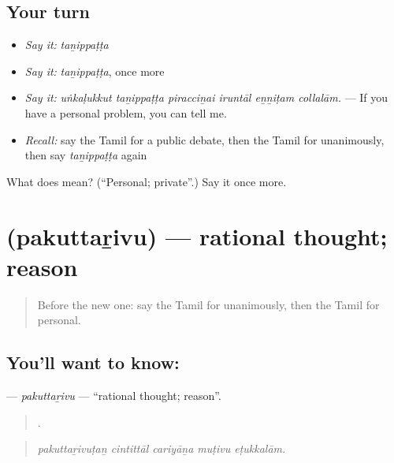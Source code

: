 \subsection*{Your turn}
\begin{itemize}
\raggedright
  \item \emph{Say it:} \emph{taṉippaṭṭa}
  \item \emph{Say it:} \emph{taṉippaṭṭa}, once more
  \item \emph{Say it:} \emph{uṅkaḷukkut taṉippaṭṭa piracciṉai iruntāl eṉṉiṭam collalām.} — If you have a personal problem, you can tell me.
  \item \emph{Recall:} say the Tamil for a public debate, then the Tamil for unanimously, then say \emph{taṉippaṭṭa} again
\end{itemize}

\begin{tcolorbox}[breakable,colback=teal!4,colframe=teal!35!black,title={Before you move on}]
What does  mean? (\textquotedblleft{}Personal; private\textquotedblright{}.) Say it once more.
\end{tcolorbox}
\section[\texorpdfstring{\ta{பகுத்தறிவு} (pakuttaṟivu)}{பகுத்தறிவு (pakuttaṟivu)}]{ (pakuttaṟivu) — rational thought; reason}

\label{lesson:TA-C397-pakuttarivu}



\begin{quote}
Before the new one: say the Tamil for unanimously, then the Tamil for personal.
\end{quote}

\subsection*{You'll want to know: }
\textbf{} — \emph{pakuttaṟivu} — \textquotedblleft{}rational thought; reason\textquotedblright{}.

\begin{quote}
    .
\end{quote}

\begin{quote}
\emph{pakuttaṟivuṭaṉ cintittāl cariyāṉa muṭivu eṭukkalām.}
\end{quote}

